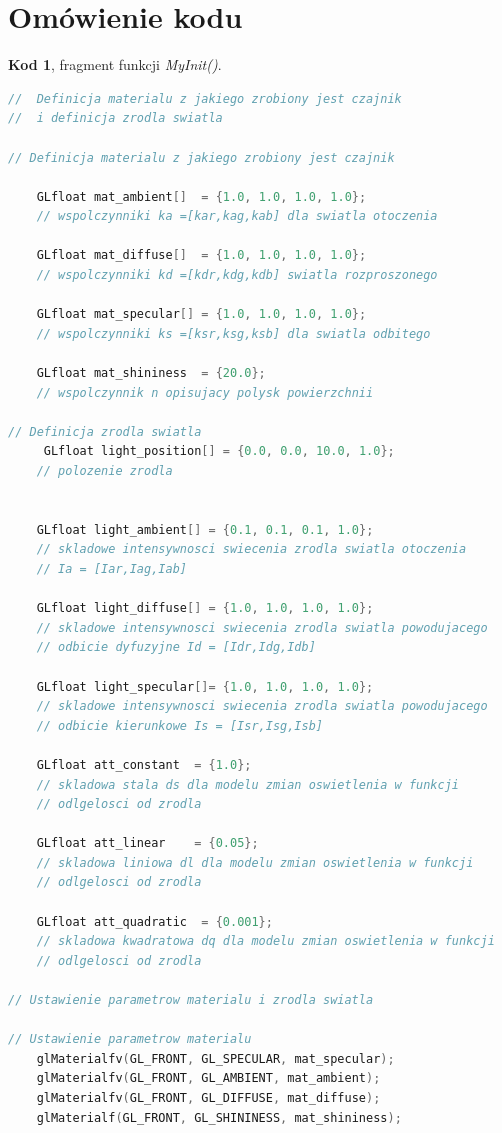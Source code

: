 \documentclass[polish,polish,a4paper]{article}
\begin{document}
  \section{Omówienie kodu}
   \textbf{Kod 1}, fragment funkcji \textit{MyInit()}.
{\small
\begin{lstlisting}[language=C++]
//  Definicja materialu z jakiego zrobiony jest czajnik 
//  i definicja zrodla swiatla

// Definicja materialu z jakiego zrobiony jest czajnik 

    GLfloat mat_ambient[]  = {1.0, 1.0, 1.0, 1.0};        
    // wspolczynniki ka =[kar,kag,kab] dla swiatla otoczenia

    GLfloat mat_diffuse[]  = {1.0, 1.0, 1.0, 1.0};
    // wspolczynniki kd =[kdr,kdg,kdb] swiatla rozproszonego

    GLfloat mat_specular[] = {1.0, 1.0, 1.0, 1.0};
    // wspolczynniki ks =[ksr,ksg,ksb] dla swiatla odbitego                
    
    GLfloat mat_shininess  = {20.0};
    // wspolczynnik n opisujacy polysk powierzchnii

// Definicja zrodla swiatla
     GLfloat light_position[] = {0.0, 0.0, 10.0, 1.0};    
    // polozenie zrodla


    GLfloat light_ambient[] = {0.1, 0.1, 0.1, 1.0};
    // skladowe intensywnosci swiecenia zrodla swiatla otoczenia
    // Ia = [Iar,Iag,Iab]

    GLfloat light_diffuse[] = {1.0, 1.0, 1.0, 1.0};        
    // skladowe intensywnosci swiecenia zrodla swiatla powodujacego
    // odbicie dyfuzyjne Id = [Idr,Idg,Idb]

    GLfloat light_specular[]= {1.0, 1.0, 1.0, 1.0};
    // skladowe intensywnosci swiecenia zrodla swiatla powodujacego
    // odbicie kierunkowe Is = [Isr,Isg,Isb]

    GLfloat att_constant  = {1.0};
    // skladowa stala ds dla modelu zmian oswietlenia w funkcji 
    // odlgelosci od zrodla

    GLfloat att_linear    = {0.05}; 
    // skladowa liniowa dl dla modelu zmian oswietlenia w funkcji 
    // odlgelosci od zrodla

    GLfloat att_quadratic  = {0.001};
    // skladowa kwadratowa dq dla modelu zmian oswietlenia w funkcji
    // odlgelosci od zrodla

// Ustawienie parametrow materialu i zrodla swiatla

// Ustawienie parametrow materialu
    glMaterialfv(GL_FRONT, GL_SPECULAR, mat_specular);
    glMaterialfv(GL_FRONT, GL_AMBIENT, mat_ambient);
    glMaterialfv(GL_FRONT, GL_DIFFUSE, mat_diffuse);
    glMaterialf(GL_FRONT, GL_SHININESS, mat_shininess);


\end{lstlisting}}
\end{document}
